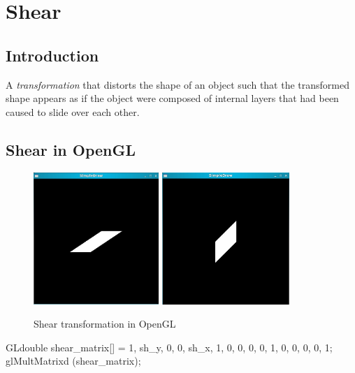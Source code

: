 \documentclass[a4paper,12pt,titlepage,twosided]{article}
\begin{document}
\pagebreak
\section{Shear}
	\subsection{Introduction}
	A \emph{transformation} that distorts the shape of an object such that the transformed shape appears as if the object were composed of internal layers that had been caused to slide over each other.

	\subsection{Shear in OpenGL}
	
	\begin{figure}
		\centering
		\includegraphics[height=50mm]{Images_final/shear_square.jpg}
		\includegraphics[height=50mm]{Images_final/shear_square_along_y.jpg}
		\caption{Shear transformation in OpenGL}
		\label{fig:shear}
	\end{figure}

	\begin{code}
		GLdouble shear_matrix[] = {1,    sh_y,  0,   0, 
					   sh_x, 1,     0,   0, 
					   0,    0,     1,   0, 
					   0,    0,     0,   1};
		glMultMatrixd (shear_matrix);
	\end{code}


\pagebreak
{}
\end{document}
